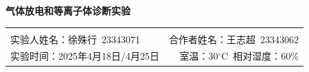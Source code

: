 \documentclass[12pt,a4paper,UTF8]{ctexart}
\begin{document}

\begin{center}
\LARGE\textbf{气体放电和等离子体诊断实验}
\end{center}

\begin{doublespacing}
	\begin{tabular}{lr}
	 & \\
	 {实验人姓名：徐殊行~23343071} & {合作者姓名：王志超~23343062}\\
	 {实验时间：2025年4月18日/4月25日} & {室温：30$^{\circ}$C~相对湿度：60\%}
	
	\end{tabular}
\end{doublespacing}

\begin{abstract}
	气体放电作为近代物理和等离子体物理的重要基础现象，广泛应用于真空电子学、材料科学与航天技术等领域。\cite{yang_gasdischarge}
	本实验通过观察放电管内的气体放电现象，测量并分析放电管的V-I特性曲线，深入理解了气体导电与金属导电的本质区别。\cite{hu_electronics}
	实验进一步利用朗缪尔探针对辉光放电正柱区内的等离子体进行了诊断，测量了探针的I-V特性曲线，并由此计算得到了等离子体的空间电位、电子温度与等离子体密度。\cite{plasmart2004probe}
	通过实验操作与数据分析，掌握了正常辉光放电不同区域的物理特征及其形成机制，加深了对气体放电过程及等离子体基本性质的认识，为后续从事相关等离子体技术研究与应用奠定了实验基础。\cite{smartvacuum2017}
	
	\noindent \textbf{关键词：气体放电；辉光放电；V-I特性曲线；朗缪尔探针；等离子体诊断} 
		
\end{abstract}
	
\renewcommand{\abstractname}{Abstract}
\end{document}
